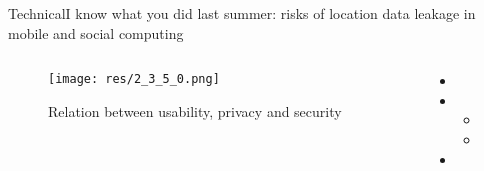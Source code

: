 \begin{frame}{Technical}{I know what you did last summer: risks of location data leakage in mobile and social computing \cite{jedrzejczyk_i_2009}}

	\begin{columns}
		\begin{column}{0.7\textwidth}
			\begin{center}
			
				\begin{figure}
					\texttt{[image: res/2\_3\_5\_0.png]}
					\caption{\label{fig:2_3_5_0}Relation between usability, privacy and security}
				\end{figure}
				
			\end{center}
		\end{column}
		
		\begin{column}{0.3\textwidth}
		
			\begin{itemize}
				\item 
				
				\item 
					\begin{itemize}
						\item 
						\item 
					\end{itemize}
				
				\item 
			\end{itemize}
			
		\end{column}
	\end{columns}
	

\end{frame}

